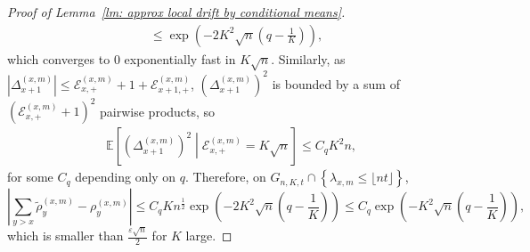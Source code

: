 \documentclass[EJP]{ejpecp} %
\newcommand{\abs}[1]{\left\vert #1 \right\vert}
\begin{document}
\begin{proof}[Proof of Lemma~\ref{lm: approx local drift by conditional means}]
\begin{align*}
		&\le \exp\left( - 2 K^2 \sqrt{n}(q - \frac{1}{K})  \right) 
		,
	\end{align*}
	which converges to $0$ exponentially fast in $K \sqrt{n}$. Similarly, as $\abs{\Delta_{x+1}^{(x,m)}} \leq  \mathcal{E}_{x,+}^{(x,m)}+1 + \mathcal{E}_{x+1,+}^{(x,m)}$,  $ \left(\Delta_{x+1}^{(x,m)} \right)^2$ is bounded by a sum of $ (\mathcal{E}_{x,+}^{(x,m)}+1)^2$ pairwise products, so
	\begin{align*}
		\mathbb{E}\left[ \left(\Delta_{x+1}^{(x,m)}\right)^2 \middle| \mathcal{E}_{x,+}^{(x,m)} = K \sqrt{n}  \right]  \leq C_q K^2 n,
	\end{align*}
	for some $C_q$ depending only on $q$.
	Therefore, on $G_{n,K,t} \cap \left\{ \lambda_{x,m} \leq\lfloor nt \rfloor \right\}$,
	\begin{equation}\label{eq: difference of cond means}
		\left| \sum_{y > x} \tilde\rho_y^{(x,m)} - \rho_y^{(x,m)} \right| \le C_q K n^{\frac{1}{2}} \exp\left( - 2K^2 \sqrt{n}(q - \frac{1}{K}) \right) \leq  C_q\exp\left( - K^2 \sqrt{n}(q - \frac{1}{K}) \right), 
	\end{equation}
	which is smaller than $\frac{\varepsilon \sqrt{n}}{2}$ for $K$ large.
	
	


\end{proof}
\end{document}
